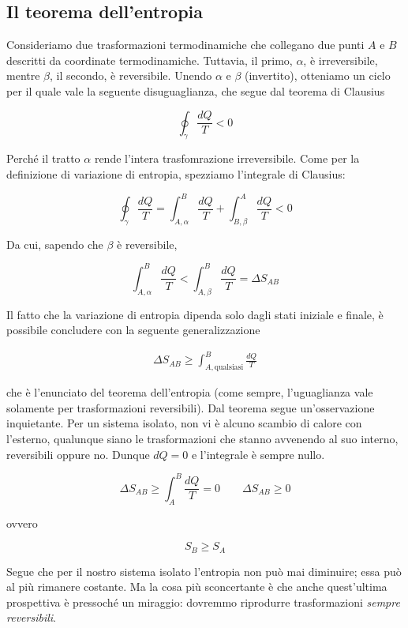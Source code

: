 \subsection*{Il teorema dell'entropia}
Consideriamo due trasformazioni termodinamiche che collegano due punti
$A$ e $B$ descritti da coordinate termodinamiche. Tuttavia, il primo,
$\alpha$, è irreversibile, mentre $\beta$, il secondo, è reversibile.
Unendo $\alpha$ e $\beta$ (invertito), otteniamo un ciclo per il quale
vale la seguente disuguaglianza, che segue dal teorema di Clausius

\[ \oint_\gamma \frac{dQ}{T} < 0 \]

\noindent Perché il tratto $\alpha$ rende l'intera trasfomrazione irreversibile.
Come per la definizione di variazione di entropia, spezziamo l'integrale
di Clausius:

\[ \oint_\gamma \frac{dQ}{T} = \int_{A,\alpha}^{B} \frac{dQ}{T} + \int_{B,\beta}^{A} \frac{dQ}{T} < 0 \]

\noindent Da cui, sapendo che $\beta$ è reversibile,

\[ \int_{A,\alpha}^{B} \frac{dQ}{T} < \int_{A,\beta}^{B} \frac{dQ}{T} = \Delta S_{AB} \]

Il fatto che la variazione di entropia dipenda solo dagli stati
iniziale e finale, è possibile concludere con la seguente generalizzazione

\begin{align}
    \Delta S_{AB} \geq \int_{A,\text{qualsiasi}}^{B} \frac{dQ}{T}
\end{align}

\noindent che è l'enunciato del teorema dell'entropia (come sempre,
l'uguaglianza vale solamente per trasformazioni reversibili). Dal
teorema segue un'osservazione inquietante. Per un sistema isolato,
non vi è alcuno scambio di calore con l'esterno, qualunque siano le
trasformazioni che stanno avvenendo al suo interno, reversibili oppure
no. Dunque $dQ = 0$ e l'integrale è sempre nullo.

\[ \Delta S_{AB} \geq \int_{A}^{B} \frac{dQ}{T} = 0 \qquad \Delta S_{AB} \geq 0 \]

\noindent ovvero

\[ S_B \geq S_A \]

\noindent Segue che per il nostro sistema isolato l'entropia non può mai
diminuire; essa può al più rimanere costante. Ma la cosa più sconcertante
è che anche quest'ultima prospettiva è pressoché un miraggio: dovremmo
riprodurre trasformazioni \textit{sempre reversibili}.

